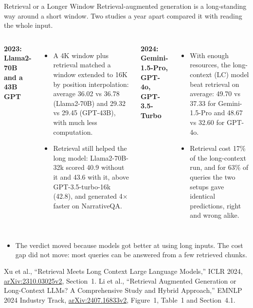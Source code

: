 \begin{frame}{Retrieval or a Longer Window}
  Retrieval-augmented generation is a long-standing way around a short window. Two studies a year apart compared it with reading the whole input.
  \vspace{0.4em}
  \begin{columns}[T,onlytextwidth]
      \textbf{2023: Llama2-70B and a 43B GPT}
      \begin{itemize}\footnotesize\itemsep0.3em
        \item[\textcolor{red}{$\blacktriangleright$}] A 4K window plus retrieval matched a window extended to 16K by position interpolation: average 36.02 vs 36.78 (Llama2-70B) and 29.32 vs 29.45 (GPT-43B), with much less computation.
        \item[\textcolor{red}{$\blacktriangleright$}] Retrieval still helped the long model: Llama2-70B-32k scored 40.9 without it and 43.6 with it, above GPT-3.5-turbo-16k (42.8), and generated 4$\times$ faster on NarrativeQA.
      \end{itemize}
      \textbf{2024: Gemini-1.5-Pro, GPT-4o, GPT-3.5-Turbo}
      \begin{itemize}\footnotesize\itemsep0.3em
        \item[\textcolor{red}{$\blacktriangleright$}] With enough resources, the long-context (LC) model beat retrieval on average: 49.70 vs 37.33 for Gemini-1.5-Pro and 48.67 vs 32.60 for GPT-4o.
        \item[\textcolor{red}{$\blacktriangleright$}] Retrieval cost 17\% of the long-context run, and for 63\% of queries the two setups gave identical predictions, right and wrong alike.
      \end{itemize}
  \end{columns}
  \vspace{0.5em}
  \begin{itemize}\footnotesize
    \item[\textcolor{red}{$\blacktriangleright$}] The verdict moved because models got better at using long inputs. The cost gap did not move: most queries can be answered from a few retrieved chunks.
  \end{itemize}
  \vspace{0.2em}
  {\scriptsize Xu et al., ``Retrieval Meets Long Context Large Language Models,'' ICLR 2024, \href{https://arxiv.org/abs/2310.03025v2}{arXiv:2310.03025v2}, Section~1. Li et al., ``Retrieval Augmented Generation or Long-Context LLMs? A Comprehensive Study and Hybrid Approach,'' EMNLP 2024 Industry Track, \href{https://arxiv.org/abs/2407.16833v2}{arXiv:2407.16833v2}, Figure~1, Table~1 and Section~4.1.}
\end{frame}

